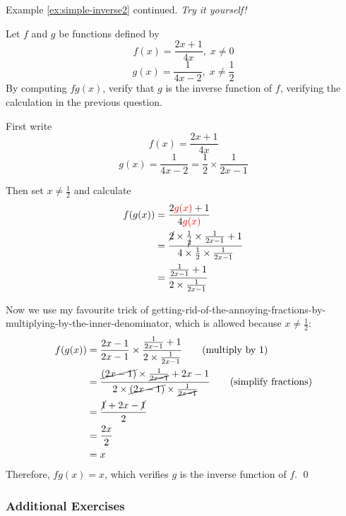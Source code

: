 \begin{exercise} \label{ex:simple-inverse-verification2}
    Example \ref{ex:simple-inverse2} continued.
    \emph{Try it yourself!}

    Let $f$ and $g$ be functions defined by 
    \[ f(x) = \frac{2x + 1}{4x}, \; x \neq 0\]
    \[ g(x) = \frac{1}{4x-2}, \; x \neq \frac{1}{2}\]
    By computing $fg(x)$, verify that $g$ is the inverse function of $f$, verifying the calculation in the previous question.
\end{exercise}
\begin{solution}
    First write 
    \[ f(x) = \frac{2x + 1}{4x}\]
    \[ g(x) = \frac{1}{4x-2} = \frac{1}{2} \times \frac{1}{2x-1}\]

    Then set $x \neq  \frac{1}{2}$ and calculate
    \begin{align*}
        f(g(x)) &= \frac{2\textcolor{red}{g(x)} + 1}{4\textcolor{red}{g(x)}} \\
         &= \frac{\cancel{2}\times\frac{1}{\cancel{2}}\times\frac{1}{2x-1} + 1}{4 \times \frac{1}{2} \times \frac{1}{2x-1}} \\
         &= \frac{\frac{1}{2x-1} + 1}{2 \times \frac{1}{2x-1}}  
    \end{align*}

    Now we use my favourite trick of getting-rid-of-the-annoying-fractions-by-multiplying-by-the-inner-denominator, which is allowed because $x \neq  \frac{1}{2}$:
    \begin{align*}
        f(g(x)) &= \frac{2x-1}{2x-1} \times \frac{\frac{1}{2x-1} + 1}{2 \times \frac{1}{2x-1}}  \tag{multiply by $1$}\\
         &= \frac{\cancel{(2x-1)} \times \frac{1}{\cancel{2x-1}} +2x - 1}{2 \times \cancel{(2x -1) } \times \frac{1}{\cancel{2x-1}}}  \tag{simplify fractions} \\ 
         &= \frac{\cancel{1} + 2x - \cancel{1}}{2} \\
         &= \frac{2x}{2} \\
         &= x
    \end{align*}
    Therefore, $fg(x) = x$, which verifies $g$ is the inverse function of $f$.
    \qed
\end{solution}

\subsubsection{Additional Exercises}

